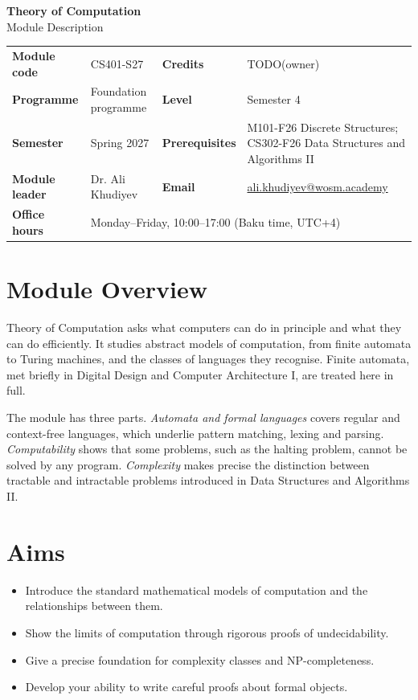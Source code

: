 \documentclass[11pt,a4paper]{article}
\makeatletter
\newcommand{\ModuleTitle}{Theory of Computation}
\newcommand{\ModuleCode}{CS401-S27}
\newcommand{\Programme}{Foundation programme}
\newcommand{\Level}{Semester 4}
\newcommand{\Semester}{Spring 2027}
\newcommand{\Credits}{TODO(owner)}
\newcommand{\ModuleLeader}{Dr. Ali Khudiyev}
\newcommand{\Email}{ali.khudiyev@wosm.academy}
\newcommand{\OfficeHours}{Monday--Friday, 10:00--17:00 (Baku time, UTC+4)}
\newcommand{\Prerequisites}{M101-F26 Discrete Structures; CS302-F26 Data Structures and Algorithms II}
\makeatother
\begin{document}
\begin{center}
  {\LARGE\bfseries\color{accent} \ModuleTitle}\\[4pt]
  {\large Module Description}
\end{center}
\vspace{6pt}

\begin{tabularx}{\textwidth}{>{\bfseries}l X >{\bfseries}l X}
\toprule
Module code   & \ModuleCode    & Credits      & \Credits \\
Programme     & \Programme     & Level        & \Level \\
Semester      & \Semester      & Prerequisites & \Prerequisites \\
Module leader & \ModuleLeader  & Email        & \href{mailto:\Email}{\Email} \\
Office hours  & \multicolumn{3}{l}{\OfficeHours} \\
\bottomrule
\end{tabularx}

\section{Module Overview}
Theory of Computation asks what computers can do in principle and what they can do
efficiently. It studies abstract models of computation, from finite automata to
Turing machines, and the classes of languages they recognise. Finite automata, met
briefly in Digital Design and Computer Architecture I, are treated here in full.

The module has three parts. \emph{Automata and formal languages} covers regular and
context-free languages, which underlie pattern matching, lexing and parsing.
\emph{Computability} shows that some problems, such as the halting problem, cannot
be solved by any program. \emph{Complexity} makes precise the distinction between
tractable and intractable problems introduced in Data Structures and Algorithms II.

\section{Aims}
\begin{itemize}
  \item Introduce the standard mathematical models of computation and the relationships between them.
  \item Show the limits of computation through rigorous proofs of undecidability.
  \item Give a precise foundation for complexity classes and NP-completeness.
  \item Develop your ability to write careful proofs about formal objects.
\end{itemize}
\end{document}
